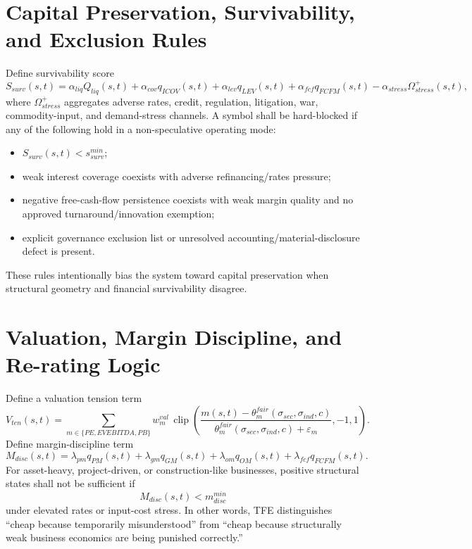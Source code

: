 \section{Capital Preservation, Survivability, and Exclusion Rules}

Define survivability score
\[
S_{surv}(s,t)=\alpha_{liq}Q_{liq}(s,t)+\alpha_{cov}q_{ICOV}(s,t)+\alpha_{lev}q_{LEV}(s,t)+\alpha_{fcf}q_{FCFM}(s,t)-\alpha_{stress}\Omega_{stress}^{+}(s,t),
\]
where $\Omega_{stress}^{+}$ aggregates adverse rates, credit, regulation, litigation, war, commodity-input, and demand-stress channels. A symbol shall be hard-blocked if any of the following hold in a non-speculative operating mode:
\begin{itemize}
    \item $S_{surv}(s,t) < s_{surv}^{min}$;
    \item weak interest coverage coexists with adverse refinancing/rates pressure;
    \item negative free-cash-flow persistence coexists with weak margin quality and no approved turnaround/innovation exemption;
    \item explicit governance exclusion list or unresolved accounting/material-disclosure defect is present.
\end{itemize}
These rules intentionally bias the system toward capital preservation when structural geometry and financial survivability disagree.

\section{Valuation, Margin Discipline, and Re-rating Logic}

Define a valuation tension term
\[
V_{ten}(s,t)=\sum_{m\in\{PE,EVEBITDA,PB\}} w_m^{val}\,\operatorname{clip}\!\left(\frac{m(s,t)-\theta_m^{fair}(\sigma_{sec},\sigma_{ind},c)}{\theta_m^{fair}(\sigma_{sec},\sigma_{ind},c)+\varepsilon_m},-1,1\right).
\]
Define margin-discipline term
\[
M_{disc}(s,t)=\lambda_{pm}q_{PM}(s,t)+\lambda_{gm}q_{GM}(s,t)+\lambda_{om}q_{OM}(s,t)+\lambda_{fcf}q_{FCFM}(s,t).
\]
For asset-heavy, project-driven, or construction-like businesses, positive structural states shall not be sufficient if
\[
M_{disc}(s,t)<m_{disc}^{min}
\]
under elevated rates or input-cost stress. In other words, TFE distinguishes ``cheap because temporarily misunderstood'' from ``cheap because structurally weak business economics are being punished correctly.''


